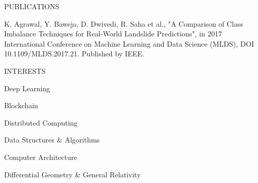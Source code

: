 \documentclass{resume} %
\begin{document}
\begin{rSection}{PUBLICATIONS} 

\item K. Agrawal, Y. Baweja, D. Dwivedi, R. Saha et
al., "A Comparison of Class Imbalance Techniques
for Real-World Landslide Predictions",
in 2017 International Conference on Machine
Learning and Data Science (MLDS), DOI
10.1109/MLDS.2017.21. Published by IEEE.

\end{rSection}



\begin{rSection}{INTERESTS}
\item Deep Learning
\item Blockchain
\item Distributed Computing
\item Data Structures \& Algorithms
\item Computer Architecture
\item Differential Geometry \& General Relativity
\end{rSection}
\end{document}
